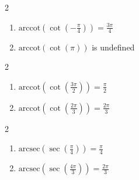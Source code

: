 \documentclass{ximera}
\begin{document}
\begin{multicols}{2}

\begin{enumerate}

\setcounter{enumi}{\value{HW}}

\item  $\text{arccot}\left(\cot\left(-\frac{\pi}{4}\right) \right) = \frac{3\pi}{4}$
\item  $\text{arccot}\left(\cot\left(\pi\right) \right)$ is undefined 

\setcounter{HW}{\value{enumi}}

\end{enumerate}

\end{multicols}

\begin{multicols}{2}

\begin{enumerate}

\setcounter{enumi}{\value{HW}}

\item  $\text{arccot}\left(\cot\left(\frac{3\pi}{2}\right) \right) = \frac{\pi}{2}$
\item  $\text{arccot}\left(\cot\left(\frac{2\pi}{3}\right) \right) = \frac{2\pi}{3}$

\setcounter{HW}{\value{enumi}}

\end{enumerate}

\end{multicols}


\begin{multicols}{2}

\begin{enumerate}

\setcounter{enumi}{\value{HW}}

\item  $\text{arcsec}\left(\sec\left(\frac{\pi}{4}\right) \right) = \frac{\pi}{4}$ 
\item  $\text{arcsec}\left(\sec\left(\frac{4\pi}{3}\right) \right) = \frac{2\pi}{3}$

\setcounter{HW}{\value{enumi}}

\end{enumerate}

\end{multicols}
\end{document}
